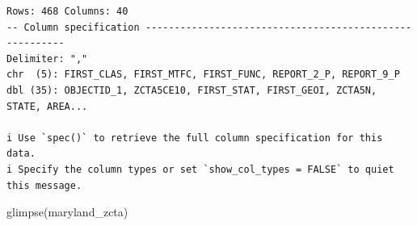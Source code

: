 \documentclass[
  letterpaper,
  DIV=11,
  numbers=noendperiod]{scrreprt}
\newenvironment{Shaded}{\begin{snugshade}}{\end{snugshade}}
\newcommand{\FunctionTok}[1]{\textcolor[rgb]{0.28,0.35,0.67}{#1}}
\newcommand{\NormalTok}[1]{\textcolor[rgb]{0.00,0.23,0.31}{#1}}
\begin{document}
\begin{verbatim}
Rows: 468 Columns: 40
-- Column specification --------------------------------------------------------
Delimiter: ","
chr  (5): FIRST_CLAS, FIRST_MTFC, FIRST_FUNC, REPORT_2_P, REPORT_9_P
dbl (35): OBJECTID_1, ZCTA5CE10, FIRST_STAT, FIRST_GEOI, ZCTA5N, STATE, AREA...

i Use `spec()` to retrieve the full column specification for this data.
i Specify the column types or set `show_col_types = FALSE` to quiet this message.
\end{verbatim}

\begin{Shaded}
\begin{Highlighting}[]
\FunctionTok{glimpse}\NormalTok{(maryland\_zcta)}
\end{Highlighting}
\end{Shaded}
\end{document}
